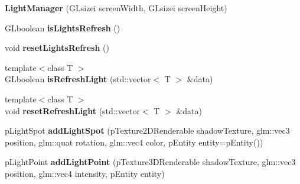 \begin{DoxyCompactItemize}
\item 
\hypertarget{classfillwave_1_1manager_1_1LightManager_a4b7977b87006efcdf07618de5acad752}{}{\bfseries Light\+Manager} (G\+Lsizei screen\+Width, G\+Lsizei screen\+Height)\label{classfillwave_1_1manager_1_1LightManager_a4b7977b87006efcdf07618de5acad752}

\item 
\hypertarget{classfillwave_1_1manager_1_1LightManager_a2283c6285ffa221a603ee05ec22347c5}{}G\+Lboolean {\bfseries is\+Lights\+Refresh} ()\label{classfillwave_1_1manager_1_1LightManager_a2283c6285ffa221a603ee05ec22347c5}

\item 
\hypertarget{classfillwave_1_1manager_1_1LightManager_a391b17400c552e9efb93a2a2a935c758}{}void {\bfseries reset\+Lights\+Refresh} ()\label{classfillwave_1_1manager_1_1LightManager_a391b17400c552e9efb93a2a2a935c758}

\item 
\hypertarget{classfillwave_1_1manager_1_1LightManager_a96c90203d0cfc1582ee6c56397ac3c8a}{}{\footnotesize template$<$class T $>$ }\\G\+Lboolean {\bfseries is\+Refresh\+Light} (std\+::vector$<$ T $>$ \&data)\label{classfillwave_1_1manager_1_1LightManager_a96c90203d0cfc1582ee6c56397ac3c8a}

\item 
\hypertarget{classfillwave_1_1manager_1_1LightManager_a6a4ac44033da265c712b33d35e3e30c9}{}{\footnotesize template$<$class T $>$ }\\void {\bfseries reset\+Refresh\+Light} (std\+::vector$<$ T $>$ \&data)\label{classfillwave_1_1manager_1_1LightManager_a6a4ac44033da265c712b33d35e3e30c9}

\item 
\hypertarget{classfillwave_1_1manager_1_1LightManager_a10802189a60a56d7da8ab19218455ade}{}p\+Light\+Spot {\bfseries add\+Light\+Spot} (p\+Texture2\+D\+Renderable shadow\+Texture, glm\+::vec3 position, glm\+::quat rotation, glm\+::vec4 color, p\+Entity entity=p\+Entity())\label{classfillwave_1_1manager_1_1LightManager_a10802189a60a56d7da8ab19218455ade}

\item 
\hypertarget{classfillwave_1_1manager_1_1LightManager_a65b9b3710d15f835347558ec1d0c68c6}{}p\+Light\+Point {\bfseries add\+Light\+Point} (p\+Texture3\+D\+Renderable shadow\+Texture, glm\+::vec3 position, glm\+::vec4 intensity, p\+Entity entity)\label{classfillwave_1_1manager_1_1LightManager_a65b9b3710d15f835347558ec1d0c68c6}


\end{DoxyCompactItemize}
